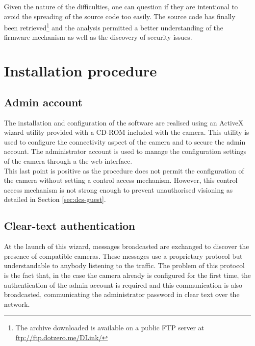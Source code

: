 Given the nature of the difficulties, one can question if they are intentional to avoid the spreading of the source code too easily.
The source code has finally been retrieved\footnote{The archive downloaded is available on a public FTP server at \url{ftp://ftp.dotzero.me/DLink/}} and the analysis permitted a better understanding of the firmware mechanism as well as the discovery of security issues.

\section{Installation procedure}
\label{sec:dcs-install}

\subsection{Admin account}

The installation and configuration of the software are realised using an ActiveX wizard utility provided with a CD-ROM included with the camera.
This utility is used to configure the connectivity aspect of the camera and to secure the admin account.
The administrator account is used to manage the configuration settings of the camera through a the web interface.\\

This last point is positive as the procedure does not permit the configuration of the camera without setting a control access mechanism.
However, this control access mechanism is not strong enough to prevent unauthorised visioning as detailed in Section \ref{sec:dcs-guest}.

\subsection{Clear-text authentication}
\label{sec:dcs-clearauth}

At the launch of this wizard, messages broadcasted are exchanged to discover the presence of compatible cameras.
These messages use a proprietary protocol but understandable to anybody listening to the traffic.
The problem of this protocol is the fact that, in the case the camera already is configured for the first time, the authentication of the admin account is required and this communication is also broadcasted, communicating the administrator password in clear text over the network.\\

